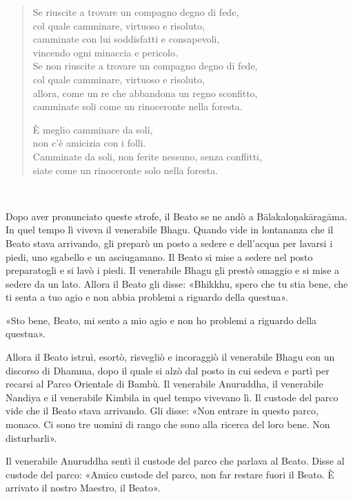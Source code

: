\begin{quote}
Se riuscite a trovare un compagno degno di fede, \\
col quale camminare, virtuoso e risoluto, \\
camminate con lui soddisfatti e consapevoli, \\
vincendo ogni minaccia e pericolo. \\
Se non riuscite a trovare un compagno degno di fede, \\
col quale camminare, virtuoso e risoluto, \\
allora, come un re che abbandona un regno sconfitto, \\
camminate soli come un rinoceronte nella foresta.

È meglio camminare da soli, \\
non c’è amicizia con i folli. \\
Camminate da soli, non ferite nessuno, senza conflitti, \\
siate come un rinoceronte solo nella foresta.
\end{quote}

\\

Dopo aver pronunciato queste strofe, il Beato se ne andò a Bālakaloṇakāragāma.
In quel tempo lì viveva il venerabile Bhagu. Quando vide in lontananza che il
Beato stava arrivando, gli preparò un posto a sedere e dell’acqua per lavarsi i
piedi, uno sgabello e un asciugamano. Il Beato si mise a sedere nel posto
preparatogli e si lavò i piedi. Il venerabile Bhagu gli prestò omaggio e si mise
a sedere da un lato. Allora il Beato gli disse: «Bhikkhu, spero che tu stia
bene, che ti senta a tuo agio e non abbia problemi a riguardo della questua».

«Sto bene, Beato, mi sento a mio agio e non ho problemi a riguardo della
questua».

Allora il Beato istruì, esortò, risvegliò e incoraggiò il venerabile Bhagu con
un discorso di Dhamma, dopo il quale si alzò dal posto in cui sedeva e partì per
recarsi al Parco Orientale di Bambù. Il venerabile Anuruddha, il venerabile
Nandiya e il venerabile Kimbila in quel tempo vivevano lì. Il custode del parco
vide che il Beato stava arrivando. Gli disse: «Non entrare in questo parco,
monaco. Ci sono tre uomini di rango che sono alla ricerca del loro bene. Non
disturbarli».

Il venerabile Anuruddha sentì il custode del parco che parlava al Beato. Disse
al custode del parco: «Amico custode del parco, non far restare fuori il Beato.
È arrivato il nostro Maestro, il Beato».

